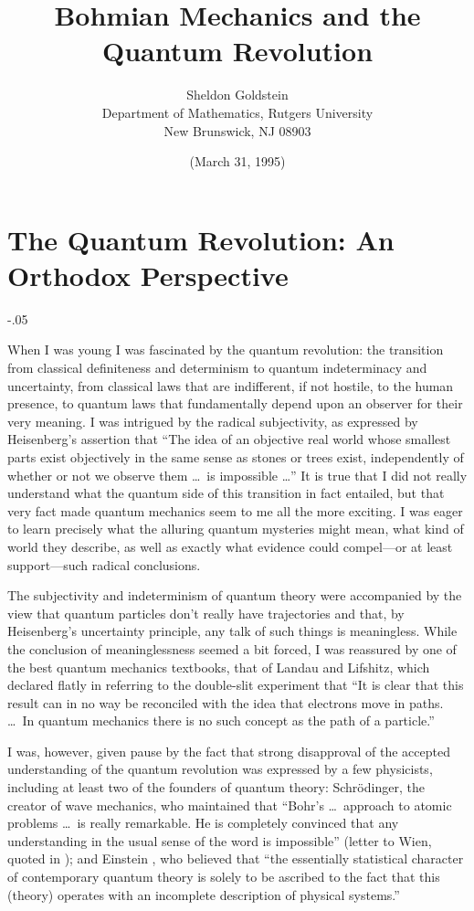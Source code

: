 \documentclass[12pt]{article}
\begin{document}
\title{Bohmian Mechanics and the Quantum Revolution}

\author{Sheldon Goldstein\\
Department of Mathematics, Rutgers University\\ New Brunswick, NJ
08903}
\date{(March 31, 1995)}
\maketitle

\section*{The Quantum Revolution: An Orthodox Perspective}
\openup-.05\jot

When I was young I was fascinated by the quantum revolution: the transition
{}from classical definiteness and determinism to quantum indeterminacy and
uncertainty, from classical laws that are indifferent, if not hostile, to
the human presence, to quantum laws that fundamentally depend upon an
observer for their very meaning. I was intrigued by the radical
subjectivity, as expressed by Heisenberg's assertion \cite{Heisenberg} that
``The idea of an objective real world whose smallest parts exist
objectively in the same sense as stones or trees exist, independently of
whether or not we observe them \dots\  is impossible \dots''  It is true that I
did not really understand what the quantum side of this transition in fact
entailed, but that very fact made quantum mechanics seem to me all the more
exciting. I was eager to learn precisely what the alluring quantum
mysteries might mean, what kind of world they describe, as well as exactly
what evidence could compel---or at least support---such radical
conclusions.

The subjectivity and indeterminism of quantum theory were accompanied by
the view that quantum particles don't really have trajectories and that, by
Heisenberg's uncertainty principle, any talk of such things is meaningless.
While the conclusion of meaninglessness seemed a bit forced, I was
reassured by one of the best quantum mechanics textbooks, that of Landau
and Lifshitz, which declared flatly in referring to the double-slit
experiment that \cite{LL} ``It is clear that this result can in no way be
reconciled with the idea that electrons move in paths. \dots\ In quantum
mechanics there is no such concept as the path of a particle.''

I was, however, given pause by the fact that strong disapproval of the
accepted understanding of the quantum revolution was expressed by a few
physicists, including at least two of the founders of quantum theory:
Schr\"odinger, the creator of wave mechanics, who maintained that ``Bohr's
\dots\  approach to atomic problems \dots\   is really remarkable. He is
completely
convinced that any understanding in the usual sense of the word is
impossible'' (letter to Wien, quoted in \cite{Moore}); and Einstein
\cite{Einstein}, who believed that ``the essentially statistical character
of contemporary quantum theory is solely to be ascribed to the fact that
this (theory) operates with an incomplete description of physical
systems.''
\end{document}
